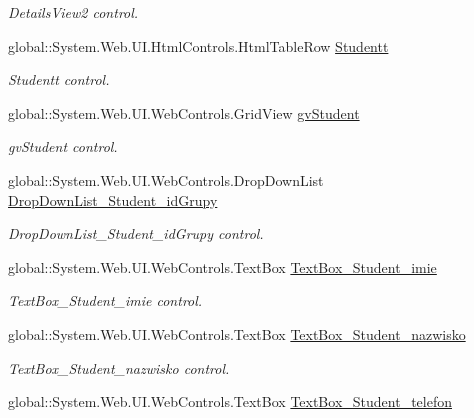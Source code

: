 \begin{DoxyCompactItemize}
\begin{DoxyCompactList}\small\item\em Details\+View2 control. \end{DoxyCompactList}\item 
global\+::\+System.\+Web.\+U\+I.\+Html\+Controls.\+Html\+Table\+Row \hyperlink{class_dziennik_ocen_web2_1_1_web_form1_aea29c07bdcfe5faa4ec1cccba2cefdbc}{Studentt}
\begin{DoxyCompactList}\small\item\em Studentt control. \end{DoxyCompactList}\item 
global\+::\+System.\+Web.\+U\+I.\+Web\+Controls.\+Grid\+View \hyperlink{class_dziennik_ocen_web2_1_1_web_form1_a6d19631d031ec79157e86874ba97ba53}{gv\+Student}
\begin{DoxyCompactList}\small\item\em gv\+Student control. \end{DoxyCompactList}\item 
global\+::\+System.\+Web.\+U\+I.\+Web\+Controls.\+Drop\+Down\+List \hyperlink{class_dziennik_ocen_web2_1_1_web_form1_aadc0ea85a73c5483e41f6530a6bd63e5}{Drop\+Down\+List\+\_\+\+Student\+\_\+id\+Grupy}
\begin{DoxyCompactList}\small\item\em Drop\+Down\+List\+\_\+\+Student\+\_\+id\+Grupy control. \end{DoxyCompactList}\item 
global\+::\+System.\+Web.\+U\+I.\+Web\+Controls.\+Text\+Box \hyperlink{class_dziennik_ocen_web2_1_1_web_form1_a239f7a307a6f095d48231922986bb266}{Text\+Box\+\_\+\+Student\+\_\+imie}
\begin{DoxyCompactList}\small\item\em Text\+Box\+\_\+\+Student\+\_\+imie control. \end{DoxyCompactList}\item 
global\+::\+System.\+Web.\+U\+I.\+Web\+Controls.\+Text\+Box \hyperlink{class_dziennik_ocen_web2_1_1_web_form1_a161c5620ac7416db86706166470fd9f4}{Text\+Box\+\_\+\+Student\+\_\+nazwisko}
\begin{DoxyCompactList}\small\item\em Text\+Box\+\_\+\+Student\+\_\+nazwisko control. \end{DoxyCompactList}\item 
global\+::\+System.\+Web.\+U\+I.\+Web\+Controls.\+Text\+Box \hyperlink{class_dziennik_ocen_web2_1_1_web_form1_a21c07d34e93b30186e57f2a7e6786389}{Text\+Box\+\_\+\+Student\+\_\+telefon}

\end{DoxyCompactItemize}
